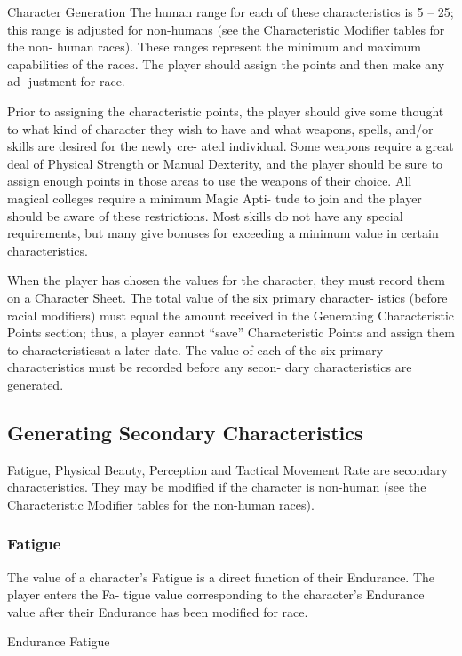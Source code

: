 \begin{Chapter}{Character Generation}
The human range for each of these characteristics is 5 – 25; this
range is adjusted for non-humans (see the Characteristic Modifier
tables for the non- human races). These ranges represent the minimum
and maximum capabilities of the races. The player should assign the
points and then make any ad- justment for race.

Prior to assigning the characteristic points, the player should give
some thought to what kind of character they wish to have and what
weapons, spells, and/or skills are desired for the newly cre- ated
individual. Some weapons require a great deal of Physical Strength or
Manual Dexterity, and the player should be sure to assign enough
points in those areas to use the weapons of their choice. All magical
colleges require a minimum Magic Apti- tude to join and the player
should be aware of these restrictions.  Most skills do not have any
special requirements, but many give bonuses for exceeding a minimum
value in certain characteristics.

When the player has chosen the values for the character, they must
record them on a Character Sheet. The total value of the six primary
character- istics (before racial modifiers) must equal the amount
received in the Generating Characteristic Points section; thus, a
player cannot “save” Characteristic Points and assign them to
characteristicsat a later date. The value of each of the six primary
characteristics must be recorded before any secon- dary
characteristics are generated.

\subsection{Generating Secondary Characteristics}

Fatigue, Physical Beauty, Perception and Tactical Movement Rate are
secondary characteristics.  They may be modified if the character is
non-human (see the Characteristic Modifier tables for the non-human
races).

\subsubsection{Fatigue}

The value of a character’s Fatigue is a direct function of their
Endurance.  The player enters the Fa- tigue value corresponding to the
character’s Endurance value after their Endurance has been modified
for race.

Endurance  Fatigue 


\end{Chapter}
